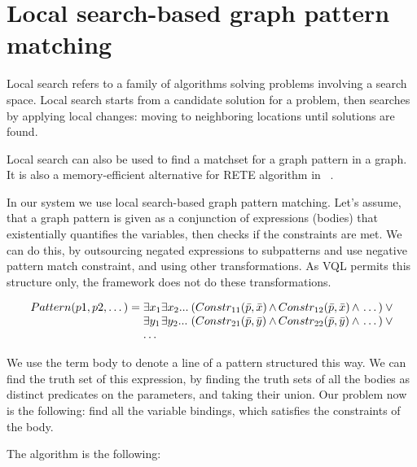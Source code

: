 \section{Local search-based graph pattern matching}

Local search refers to a family of algorithms solving problems involving a search space. 
Local search starts from a candidate solution for a problem, then searches by applying local changes: moving to neighboring locations until solutions are found.

Local search can also be used to find a matchset for a graph pattern in a graph.
It is also a memory-efficient alternative for RETE algorithm in \viatra{}~\cite{bur-marton-msc}.

In our system we use local search-based graph pattern matching. 
Let's assume, that a graph pattern is given as a conjunction of expressions (bodies) that existentially quantifies the variables, then checks if the constraints are met.
We can do this, by outsourcing negated expressions to subpatterns and use negative pattern match constraint, and using other transformations.
As VQL permits this structure only, the framework does not do these transformations.


\begin{equation}
\begin{array}{@{}r@{}l@{}l@{}l@{}l@{}l@{}}
Pattern(p1, p2, \dots) = \;
& \exists{x_1} & \exists{x_2}... \: & 
(Constr_{11}(\bar{p},\bar{x} ) & \, \wedge \, Constr_{12}(\bar{p},\bar{x} ) & \, \wedge \, \dots{}) \: \vee \\

& \exists{y_1} & \exists{y_2}... \: & 
(Constr_{21}(\bar{p},\bar{y} ) & \, \wedge \, Constr_{22}(\bar{p},\bar{y} ) & \, \wedge \, \dots{}) \: \vee \\
& \dots{}
\end{array}
\end{equation}

We use the term body to denote a line of a pattern structured this way.
We can find the truth set of this expression, by finding the truth sets of all the bodies as distinct predicates on the parameters, and taking their union.
Our problem now is the following: find all the variable bindings, which satisfies the constraints of the body.

The algorithm is the following:




